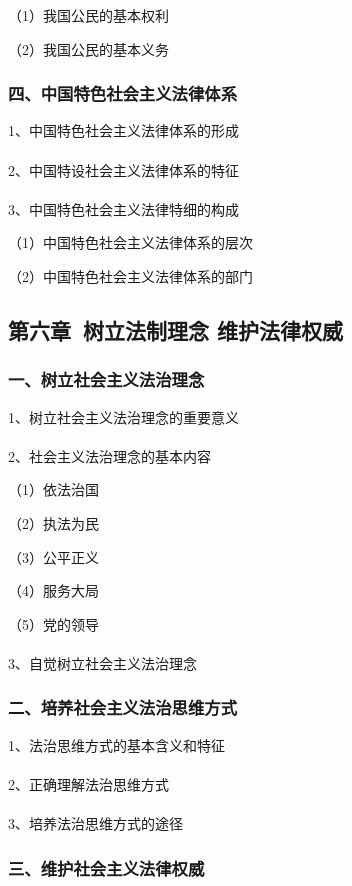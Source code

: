 \documentclass{ctexart}
\begin{document}
（1）我国公民的基本权利

（2）我国公民的基本义务

\subsubsection{四、中国特色社会主义法律体系}
1、中国特色社会主义法律体系的形成
\\\\

2、中国特设社会主义法律体系的特征
\\\\

3、中国特色社会主义法律特细的构成

（1）中国特色社会主义法律体系的层次

（2）中国特色社会主义法律体系的部门


\subsection{第六章\ 树立法制理念 维护法律权威}
\subsubsection{一、树立社会主义法治理念}

1、树立社会主义法治理念的重要意义
\\\\

2、社会主义法治理念的基本内容

（1）依法治国

（2）执法为民

（3）公平正义

（4）服务大局

（5）党的领导
\\\\

3、自觉树立社会主义法治理念


\subsubsection{二、培养社会主义法治思维方式}
1、法治思维方式的基本含义和特征
\\\\

2、正确理解法治思维方式
\\\\

3、培养法治思维方式的途径

\subsubsection{三、维护社会主义法律权威}
\end{document}
